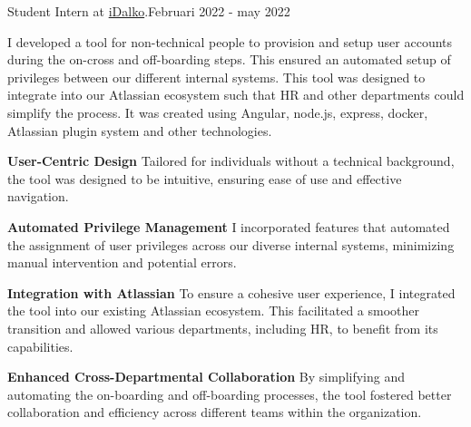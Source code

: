 Student Intern at {\href{https://www.idalko.com}{iDalko}}.{\textcolor{mygrey}{\hspace*{\fill}Februari 2022 - may 2022}}
\vspace{.55em}
\begin{flushleft}
\par
I developed a tool for non-technical people to provision and setup user accounts during the on-cross and off-boarding steps. This ensured an automated setup of privileges between our different internal systems.
This tool was designed to integrate into our Atlassian ecosystem such that HR and other departments could simplify the process.
It was created using Angular, node.js, express, docker, Atlassian plugin system and other technologies.
\vspace{.55em}
\par
\textbf{User-Centric Design}
Tailored for individuals without a technical background, the tool was designed to be intuitive, ensuring ease of use and effective navigation.
\vspace{.55em}
\par
\textbf{Automated Privilege Management}
I incorporated features that automated the assignment of user privileges across our diverse internal systems, minimizing manual intervention and potential errors.
\vspace{.55em}
\par
\textbf{Integration with Atlassian}
To ensure a cohesive user experience, I integrated the tool into our existing Atlassian ecosystem. This facilitated a smoother transition and allowed various departments, including HR, to benefit from its capabilities.
\vspace{.55em}
\par
\textbf{Enhanced Cross-Departmental Collaboration}
By simplifying and automating the on-boarding and off-boarding processes, the tool fostered better collaboration and efficiency across different teams within the organization.
\end{flushleft}
